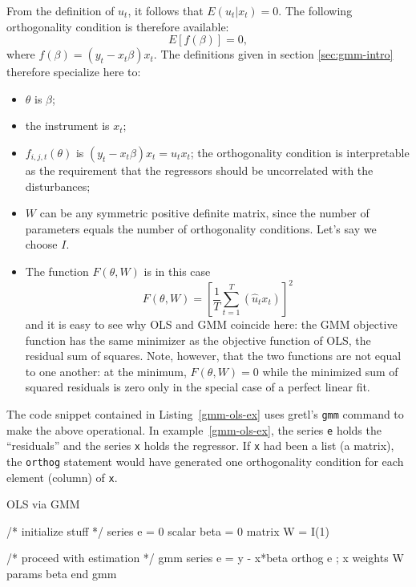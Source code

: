 From the definition of $u_t$, it follows that $E(u_t|x_t) = 0$. 
The following orthogonality condition is therefore available:
\begin{equation}
  \label{eq:oc-ols}
  E \left[ f(\beta) \right] = 0 ,
\end{equation}
where $f(\beta) = (y_t - x_t \beta) x_t$. The definitions given in
section \ref{sec:gmm-intro} therefore specialize here to:
\begin{itemize}
\item $\theta$ is $\beta$;
\item the instrument is $x_t$;
\item $f_{i,j,t}(\theta)$ is $(y_t - x_t \beta) x_t = u_t
  x_t$; the orthogonality condition is interpretable as the
  requirement that the regressors should be uncorrelated with the
  disturbances;
\item $W$ can be any symmetric positive definite matrix, since
  the number of parameters equals the number of orthogonality
  conditions. Let's say we choose $I$.
\item The function $F(\theta, W)$ is in this case
  \[
    F(\theta, W) = \left[ \frac{1}{T} \sum_{t=1}^T (\hat{u}_t x_t) \right]^2
  \]
  and it is easy to see why OLS and GMM coincide here: the GMM
  objective function has the same minimizer as the objective function
  of OLS, the residual sum of squares. Note, however, that the two
  functions are not equal to one another: at the minimum, $F(\theta,
  W) = 0$ while the minimized sum of squared residuals is zero only in
  the special case of a perfect linear fit.
\end{itemize}

The code snippet contained in Listing~\ref{gmm-ols-ex} uses gretl's
\texttt{gmm} command to make the above operational.  In
example~\ref{gmm-ols-ex}, the series \texttt{e} holds the
``residuals'' and the series \texttt{x} holds the regressor.  If
\texttt{x} had been a list (a matrix), the \texttt{orthog} statement
would have generated one orthogonality condition for each element
(column) of \texttt{x}.

\begin{script}[htbp]
  \caption{OLS via GMM}
  \label{gmm-ols-ex}
\begin{code}
/* initialize stuff */
series e = 0
scalar beta = 0
matrix W = I(1)

/* proceed with estimation */
gmm 
  series e = y - x*beta
  orthog e ; x
  weights W
  params beta
end gmm
\end{code}
\end{script}


